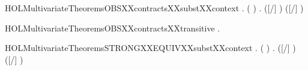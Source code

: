 \newcommand{\HOLMultivariateTheoremsOBSXXcontractsXXreflexive}{\UseVerbatim{HOLMultivariateTheoremsOBSXXcontractsXXreflexive}}
\begin{SaveVerbatim}{HOLMultivariateTheoremsOBSXXcontractsXXsubstXXcontext}
\HOLTokenTurnstile{} \HOLSymConst{\HOLTokenForall{}}  .
         \HOLSymConst{\HOLTokenConj{}} (  \HOLSymConst{=}  ) \HOLSymConst{\HOLTokenConj{}}
          \HOLSymConst{\HOLTokenImp{}}
       \HOLSymConst{\HOLTokenForall{}}.    \HOLSymConst{\HOLTokenImp{}}  ([/] ) ([/] )
\end{SaveVerbatim}
\newcommand{\HOLMultivariateTheoremsOBSXXcontractsXXsubstXXcontext}{\UseVerbatim{HOLMultivariateTheoremsOBSXXcontractsXXsubstXXcontext}}
\begin{SaveVerbatim}{HOLMultivariateTheoremsOBSXXcontractsXXtransitive}
\HOLTokenTurnstile{} \HOLSymConst{\HOLTokenForall{}}  .
          \HOLSymConst{\HOLTokenConj{}}    \HOLSymConst{\HOLTokenImp{}}
         
\end{SaveVerbatim}
\newcommand{\HOLMultivariateTheoremsOBSXXcontractsXXtransitive}{\UseVerbatim{HOLMultivariateTheoremsOBSXXcontractsXXtransitive}}
\begin{SaveVerbatim}{HOLMultivariateTheoremsSTRONGXXEQUIVXXsubstXXcontext}
\HOLTokenTurnstile{} \HOLSymConst{\HOLTokenForall{}}  .
         \HOLSymConst{\HOLTokenConj{}} (  \HOLSymConst{=}  ) \HOLSymConst{\HOLTokenConj{}}
          \HOLSymConst{\HOLTokenImp{}}
       \HOLSymConst{\HOLTokenForall{}}.    \HOLSymConst{\HOLTokenImp{}}  ([/] ) ([/] )
\end{SaveVerbatim}
\newcommand{\HOLMultivariateTheoremsSTRONGXXEQUIVXXsubstXXcontext}{\UseVerbatim{HOLMultivariateTheoremsSTRONGXXEQUIVXXsubstXXcontext}}

